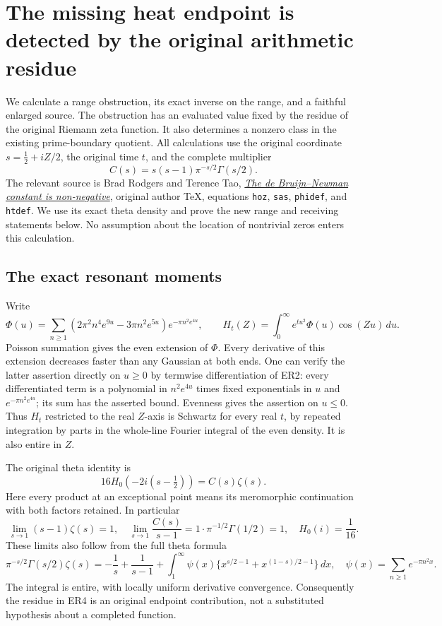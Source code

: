 \section{The missing heat endpoint is detected by the original arithmetic residue}
\label{sec:endpoint-resonance}

We calculate a range obstruction, its exact inverse on the range, and a
faithful enlarged source. The obstruction has an evaluated value fixed
by the residue of the original Riemann zeta function. It also determines
a nonzero class in the existing prime-boundary quotient. All calculations
use the original coordinate \(s=\tfrac12+iZ/2\), the original time \(t\),
and the complete multiplier
\[
 C(s)=s(s-1)\pi^{-s/2}\Gamma(s/2).
 \tag{ER1}
\]
The relevant source is Brad Rodgers and Terence Tao,
\href{https://arxiv.org/abs/1801.05914v5}{\emph{The de Bruijn--Newman
constant is non-negative}}, original author TeX, equations
\texttt{hoz}, \texttt{sas}, \texttt{phidef}, and \texttt{htdef}.
We use its exact theta density and prove the new range and receiving
statements below. No assumption about the location of nontrivial zeros
enters this calculation.

\subsection{The exact resonant moments}

Write
\[
 \Phi(u)=\sum_{n\geq1}
 (2\pi^2n^4e^{9u}-3\pi n^2e^{5u})e^{-\pi n^2e^{4u}},
 \qquad H_t(Z)=\int_0^\infty e^{tu^2}\Phi(u)\cos(Zu)\,du .
 \tag{ER2}
\]
Poisson summation gives the even extension of \(\Phi\). Every derivative
of this extension decreases faster than any Gaussian at both ends.
One can verify the latter assertion directly on \(u\geq0\) by
termwise differentiation of ER2: every differentiated term is a
polynomial in \(n^2e^{4u}\) times fixed exponentials in \(u\) and
\(e^{-\pi n^2e^{4u}}\); its sum has the asserted bound.
Evenness gives the assertion on \(u\leq0\). Thus \(H_t\) restricted
to the real \(Z\)-axis is Schwartz for every real \(t\), by repeated
integration by parts in the whole-line Fourier integral of the even
density. It is also entire in \(Z\).

The original theta identity is
\[
 16H_0(-2i(s-\tfrac12))=C(s)\zeta(s).
 \tag{ER3}
\]
Here every product at an exceptional point means its meromorphic
continuation with both factors retained. In particular
\[
 \lim_{s\to1}(s-1)\zeta(s)=1,\quad
 \lim_{s\to1}\frac{C(s)}{s-1}
 =1\cdot\pi^{-1/2}\Gamma(1/2)=1,\quad H_0(i)=\frac1{16}.
 \tag{ER4}
\]
These limits also follow from the full theta formula
\[
 \pi^{-s/2}\Gamma(s/2)\zeta(s)
 =-\frac1s+\frac1{s-1}
 +\int_1^\infty\psi(x)
   \{x^{s/2-1}+x^{(1-s)/2-1}\}\,dx,\quad
 \psi(x)=\sum_{n\ge1}e^{-\pi n^2x}.
 \tag{ER5}
\]
The integral is entire, with locally uniform derivative convergence.
Consequently the residue in ER4 is an original endpoint contribution,
not a substituted hypothesis about a completed function.

